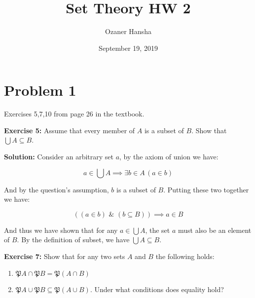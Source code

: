 \documentclass{article}
\begin{document}
\title{Set Theory HW 2}
\author{Ozaner Hansha}
\date{September 19, 2019}
\maketitle

\newcommand{\pset}[1]{\mathfrak P#1}
\newcommand{\psetp}[1]{\mathfrak P(#1)}
\newcommand{\and}{\,\,\&\,\,}
\newcommand{\OR}{\text{ or }}
\newcommand{\pair}[2]{<#1,#2>}
\renewcommand{\setminus}{-}


\section*{Problem 1}
Exercises 5,7,10 from page 26 in the textbook.
\bigskip

\noindent\textbf{Exercise 5:} Assume that every member of $A$ is a subset of $B$. Show that $\bigcup A\subseteq B$.
\bigskip

\noindent\textbf{Solution:} Consider an arbitrary set $a$, by the axiom of union we have: 

\begin{equation*}
    a\in\bigcup A\implies \exists b\in A\, (a\in b)
\end{equation*}

And by the question's assumption, $b$ is a subset of $B$. Putting these two together we have:

\begin{equation*}
    ((a\in b)\and (b\subseteq B))\implies a\in B\tag{def. of subset}
\end{equation*}

And thus we have shown that for any $a\in\bigcup A$, the set $a$ must also be an element of $B$. By the definition of subset, we have $\bigcup A\subseteq B$.

\bigskip

\noindent\textbf{Exercise 7:} Show that for any two sets $A$ and $B$ the following holds:

\begin{enumerate}[label=\alph*)]
    \item $\pset A\cap\pset B=\psetp{A\cap B}$
    \item $\pset A\cup\pset B\subseteq\psetp{A\cup B}$. Under what conditions does equality hold?
\end{enumerate}
\smallskip
\end{document}
